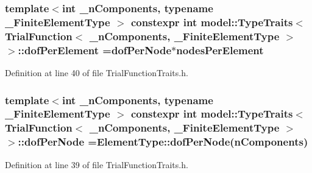 \subsubsection[{dof\+Per\+Element}]{\setlength{\rightskip}{0pt plus 5cm}template$<$int \+\_\+n\+Components, typename \+\_\+\+Finite\+Element\+Type $>$ constexpr int {\bf model\+::\+Type\+Traits}$<$ {\bf Trial\+Function}$<$ \+\_\+n\+Components, \+\_\+\+Finite\+Element\+Type $>$ $>$\+::dof\+Per\+Element ={\bf dof\+Per\+Node}$\ast${\bf nodes\+Per\+Element}\hspace{0.3cm}{\ttfamily [static]}}\label{structmodel_1_1_type_traits_3_01_trial_function_3_01__n_components_00_01___finite_element_type_01_4_01_4_af917eb0f3f950e58ec3dc6723ace8a3a}


Definition at line 40 of file Trial\+Function\+Traits.\+h.

\hypertarget{structmodel_1_1_type_traits_3_01_trial_function_3_01__n_components_00_01___finite_element_type_01_4_01_4_a7151e05cf54e22aea27ba3f556816760}{}
\subsubsection[{dof\+Per\+Node}]{\setlength{\rightskip}{0pt plus 5cm}template$<$int \+\_\+n\+Components, typename \+\_\+\+Finite\+Element\+Type $>$ constexpr int {\bf model\+::\+Type\+Traits}$<$ {\bf Trial\+Function}$<$ \+\_\+n\+Components, \+\_\+\+Finite\+Element\+Type $>$ $>$\+::dof\+Per\+Node =Element\+Type\+::dof\+Per\+Node({\bf n\+Components})\hspace{0.3cm}{\ttfamily [static]}}\label{structmodel_1_1_type_traits_3_01_trial_function_3_01__n_components_00_01___finite_element_type_01_4_01_4_a7151e05cf54e22aea27ba3f556816760}


Definition at line 39 of file Trial\+Function\+Traits.\+h.

\hypertarget{structmodel_1_1_type_traits_3_01_trial_function_3_01__n_components_00_01___finite_element_type_01_4_01_4_a799bac386a22215dacc0f0a61172f07a}{}
